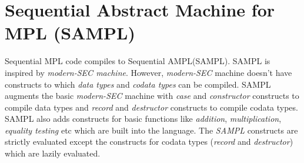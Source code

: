 \documentclass[11pt]{article}
\newcommand{\<}{\langle}
\renewcommand{\>}{\rangle}
\begin{document}
\section {Sequential Abstract Machine for MPL (SAMPL)}
Sequential MPL code compiles to Sequential AMPL(SAMPL). SAMPL is inspired by {\em modern-SEC machine}. However, {\em modern-SEC} machine doesn't have constructs to which {\em data types} and {\em codata types} can be compiled. SAMPL augments the basic {\em modern-SEC} machine with {\em case} and {\em constructor} constructs to compile data types and  {\em record} and {\em destructor} constructs to compile codata types. SAMPL also adds constructs for basic functions like {\em addition}, {\em multiplication}, {\em equality testing} etc which are built into the language. The {\em SAMPL} constructs are strictly evaluated except the constructs for codata types ({\em record} and {\em destructor}) which are lazily evaluated.
\end{document}
